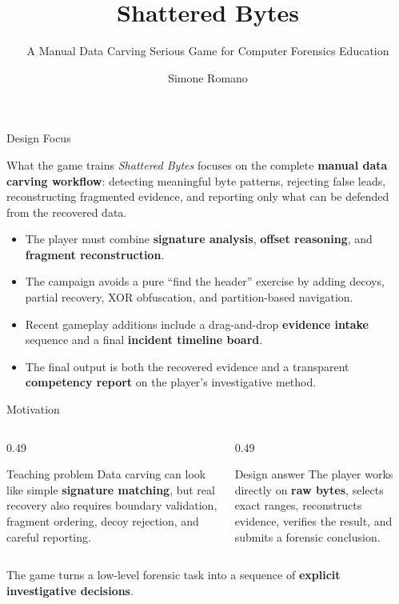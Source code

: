 \documentclass[aspectratio=169]{beamer}
\title[Shattered Bytes]{Shattered Bytes}
\subtitle{A Manual Data Carving Serious Game for Computer Forensics Education}
\author{Simone Romano}
\institute{Computer Forensics and Cyber Crime Analysis}
\begin{document}
\begin{frame}
  \titlepage
\end{frame}

\begin{frame}{Design Focus}
  \begin{block}{What the game trains}
    \emph{Shattered Bytes} focuses on the complete \textbf{manual data carving workflow}:
    detecting meaningful byte patterns, rejecting false leads, reconstructing fragmented
    evidence, and reporting only what can be defended from the recovered data.
  \end{block}

  \vspace{0.2cm}
  \begin{itemize}
    \item The player must combine \textbf{signature analysis}, \textbf{offset reasoning},
      and \textbf{fragment reconstruction}.
    \item The campaign avoids a pure ``find the header'' exercise by adding decoys,
      partial recovery, XOR obfuscation, and partition-based navigation.
    \item Recent gameplay additions include a drag-and-drop \textbf{evidence intake}
      sequence and a final \textbf{incident timeline board}.
    \item The final output is both the recovered evidence and a transparent
      \textbf{competency report} on the player's investigative method.
  \end{itemize}
\end{frame}

\begin{frame}{Motivation}
  \begin{columns}[T,onlytextwidth]
    \begin{column}{0.49\textwidth}
      \begin{block}{Teaching problem}
        Data carving can look like simple \textbf{signature matching}, but real recovery
        also requires boundary validation, fragment ordering, decoy rejection, and careful
        reporting.
      \end{block}
    \end{column}
    \begin{column}{0.49\textwidth}
      \begin{block}{Design answer}
        The player works directly on \textbf{raw bytes}, selects exact ranges,
        reconstructs evidence, verifies the result, and submits a forensic conclusion.
      \end{block}
    \end{column}
  \end{columns}

  \vspace{0.3cm}
  The game turns a low-level forensic task into a sequence of \textbf{explicit investigative decisions}.
\end{frame}
\end{document}
